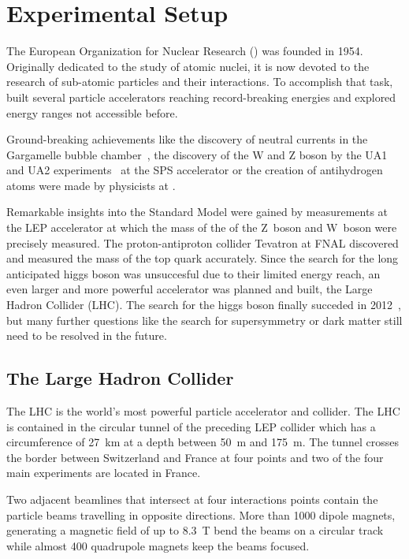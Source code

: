 
\chapter{Experimental Setup}
\label{sec:experimental_setup}

The European Organization for Nuclear Research (\CERN) was founded in 1954.
Originally dedicated to the study of atomic nuclei, it is now devoted to the
research of sub-atomic particles and their interactions. To accomplish that
task, \CERN built several particle accelerators reaching record-breaking
energies and explored energy ranges not accessible before.

Ground-breaking achievements like the discovery of neutral currents in the
Gargamelle bubble chamber~\cite{Hasert:1973ff}, the discovery of the W and Z
boson by the UA1 and UA2 experiments~\cite{Arnison:1983rp} at the SPS
accelerator or the creation of antihydrogen atoms were made by physicists at
\CERN.

Remarkable insights into the Standard Model were gained by measurements at the
LEP accelerator at which the mass of the of the Z~boson and W~boson were
precisely measured. The proton-antiproton collider Tevatron at FNAL discovered
and measured the mass of the top quark accurately. Since the search for the long
anticipated higgs boson was unsuccesful due to their limited energy reach, an even
larger and more powerful accelerator was planned and built, the Large Hadron
Collider (LHC). The search for the higgs boson finally succeded in
2012~\cite{Chatrchyan:2012xdj,Aad:2012tfa}, but many further questions like the search for
supersymmetry or dark matter still need to be resolved in the future.

\section{The Large Hadron Collider}

The LHC is the world's most powerful particle accelerator and collider. The LHC
is contained in the circular tunnel of the preceding LEP collider which has a
circumference of \SI{27}{\kilo \meter} at a depth between \SI{50}{\meter} and
\SI{175}{\meter}.  The tunnel crosses the border between Switzerland and France
at four points and two of the four main experiments are located in France. 

Two adjacent beamlines that intersect at four interactions points contain the
particle beams travelling in opposite directions. More than 1000 dipole magnets,
generating a magnetic field of up to \SI{8.3}{\tesla} bend the beams on
a circular track while almost 400 quadrupole magnets keep the beams focused. 

